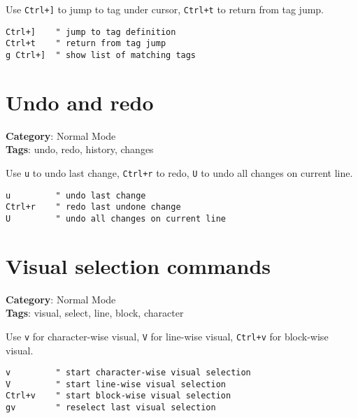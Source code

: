 {{{{{{{{{{Use {\footnotesize \Verb§Ctrl+]§} to jump to tag under cursor, {\footnotesize \Verb§Ctrl+t§} to return from tag jump.

\begin{Exa*}{}
\begin{Verbatim}[fontsize=\footnotesize, breaklines, breakanywhere]
Ctrl+]    " jump to tag definition
Ctrl+t    " return from tag jump
g Ctrl+]  " show list of matching tags
\end{Verbatim}
\end{Exa*}

\section{Undo and redo}

\textbf{Category}: Normal Mode\\ \textbf{Tags}: undo, redo, history, changes
\vspace{0.5cm}

Use {\footnotesize \Verb§u§} to undo last change, {\footnotesize \Verb§Ctrl+r§} to redo, {\footnotesize \Verb§U§} to undo all changes on current line.

\begin{Exa*}{}
\begin{Verbatim}[fontsize=\footnotesize, breaklines, breakanywhere]
u         " undo last change
Ctrl+r    " redo last undone change
U         " undo all changes on current line
\end{Verbatim}
\end{Exa*}

\section{Visual selection commands}

\textbf{Category}: Normal Mode\\ \textbf{Tags}: visual, select, line, block, character
\vspace{0.5cm}

Use {\footnotesize \Verb§v§} for character-wise visual, {\footnotesize \Verb§V§} for line-wise visual, {\footnotesize \Verb§Ctrl+v§} for block-wise visual.

\begin{Exa*}{}
\begin{Verbatim}[fontsize=\footnotesize, breaklines, breakanywhere]
v         " start character-wise visual selection
V         " start line-wise visual selection
Ctrl+v    " start block-wise visual selection
gv        " reselect last visual selection
\end{Verbatim}
\end{Exa*}

}}}}}}}}}}
